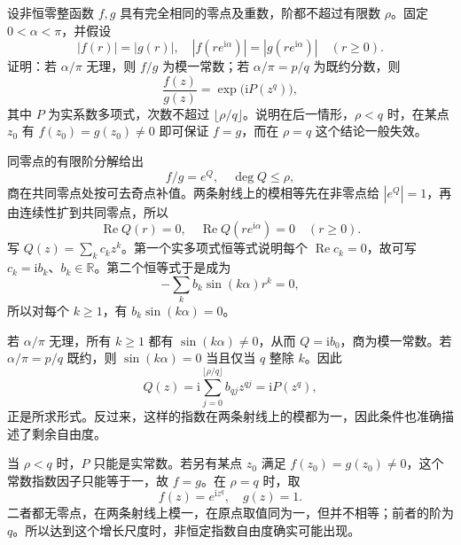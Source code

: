 \begin{exercise}[两射线模数据的刚性]\label{b3:ex:20-draft-06}
设非恒零整函数 \(f,g\) 具有完全相同的零点及重数，阶都不超过有限数 \(\rho\)。固定 \(0<\alpha<\pi\)，并假设
\[
 |f(r)|=|g(r)|,\quad
 |f(re^{\mathrm i\alpha})|=|g(re^{\mathrm i\alpha})|
 \quad(r\ge0).
\]
证明：若 \(\alpha/\pi\) 无理，则 \(f/g\) 为模一常数；若 \(\alpha/\pi=p/q\) 为既约分数，则
\[
 \frac{f(z)}{g(z)}=\exp\bigl(\mathrm i P(z^q)\bigr),
\]
其中 \(P\) 为实系数多项式，次数不超过 \(\lfloor\rho/q\rfloor\)。说明在后一情形，\(\rho<q\) 时，在某点 \(z_0\) 有 \(f(z_0)=g(z_0)\ne0\) 即可保证 \(f=g\)，而在 \(\rho=q\) 这个结论一般失效。
\end{exercise}
\begin{solution}
同零点的有限阶分解给出
\[
 f/g=e^Q,\quad \deg Q\le\rho,
\]
商在共同零点处按可去奇点补值。两条射线上的模相等先在非零点给 \(|e^Q|=1\)，再由连续性扩到共同零点，所以
\[
 \operatorname{Re}Q(r)=0,\quad
 \operatorname{Re}Q(re^{\mathrm i\alpha})=0\quad(r\ge0).
\]
写 \(Q(z)=\sum_k c_kz^k\)。第一个实多项式恒等式说明每个 \(\operatorname{Re}c_k=0\)，故可写 \(c_k=\mathrm i b_k\)、\(b_k\in\mathbb R\)。第二个恒等式于是成为
\[
 -\sum_k b_k\sin(k\alpha)r^k=0,
\]
所以对每个 \(k\ge1\)，有 \(b_k\sin(k\alpha)=0\)。

若 \(\alpha/\pi\) 无理，所有 \(k\ge1\) 都有 \(\sin(k\alpha)\ne0\)，从而 \(Q=\mathrm i b_0\)，商为模一常数。若 \(\alpha/\pi=p/q\) 既约，则 \(\sin(k\alpha)=0\) 当且仅当 \(q\) 整除 \(k\)。因此
\[
 Q(z)=\mathrm i\sum_{j=0}^{\lfloor\rho/q\rfloor}b_{qj}z^{qj}
 =\mathrm iP(z^q),
\]
正是所求形式。反过来，这样的指数在两条射线上的模都为一，因此条件也准确描述了剩余自由度。

当 \(\rho<q\) 时，\(P\) 只能是实常数。若另有某点 \(z_0\) 满足 \(f(z_0)=g(z_0)\ne0\)，这个常数指数因子只能等于一，故 \(f=g\)。在 \(\rho=q\) 时，取
\[
 f(z)=e^{\mathrm iz^q},\quad g(z)=1.
\]
二者都无零点，在两条射线上模一，在原点取值同为一，但并不相等；前者的阶为 \(q\)。所以达到这个增长尺度时，非恒定指数自由度确实可能出现。
\end{solution}

